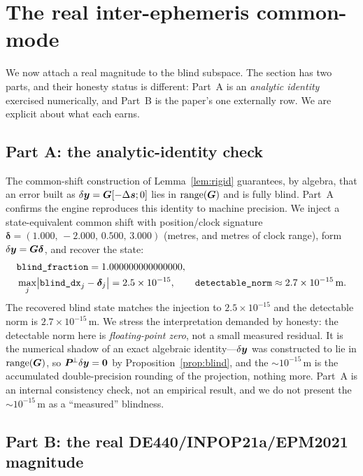 \section{The real inter-ephemeris common-mode}
\label{sec:anchor}

We now attach a real magnitude to the blind subspace. The section has two parts, and
their honesty status is different: Part~A is an \emph{analytic identity} exercised
numerically, and Part~B is the paper's one externally \Validated{} row. We are explicit
about what each earns.

\subsection{Part A: the analytic-identity check}
\label{sec:partA}

The common-shift construction of Lemma~\ref{lem:rigid} guarantees, by algebra, that an
error built as $\delta\bm{y}=\bm{G}[-\Delta\bm{s};0]$ lies in $\operatorname{range}(\bm{G})$ and is fully blind.
Part~A confirms the engine reproduces this identity to machine precision. We inject a
state-equivalent common shift with position/clock signature
$\bm\delta=(1.000,\,-2.000,\,0.500,\,3.000)$ (metres, and metres of clock range), form
$\delta\bm{y}=\bm{G}\bm\delta$, and recover the state:
\begin{equation}
\begin{aligned}
  &\texttt{blind\_fraction}=1.000000000000000, \\
  &\max_j\bigl|\texttt{blind\_dx}_j-\bm\delta_j\bigr|=2.5\times10^{-15},\qquad
  \texttt{detectable\_norm}\approx2.7\times10^{-15}\,\text{m}.
\end{aligned}
  \label{eq:partA}
\end{equation}
The recovered blind state matches the injection to $2.5\times10^{-15}$ and the
detectable norm is $2.7\times10^{-15}\,$m. We stress the interpretation demanded by
honesty: the detectable norm here is \emph{floating-point zero}, not a small measured
residual. It is the numerical shadow of an exact algebraic identity---$\delta\bm{y}$ was
constructed to lie in $\operatorname{range}(\bm{G})$, so $\bm{P}^{\!\perp}\delta\bm{y}=\bm 0$ by
Proposition~\ref{prop:blind}, and the $\sim\!10^{-15}\,$m is the accumulated
double-precision rounding of the projection, nothing more. Part~A is an internal
consistency check, not an empirical result, and we do not present the
$\sim\!10^{-15}\,$m as a ``measured'' blindness.

\subsection{Part B: the real DE440/INPOP21a/EPM2021 magnitude}
\label{sec:partB}

